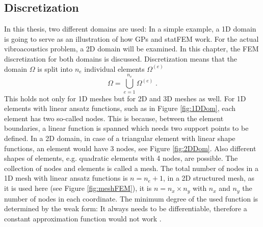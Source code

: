 \documentclass[%
  a4paper,oneside,%
  11pt,%
  smallchapters,
  style=printdev,
  extramargin,
  green,%
  rgb, <cmyk>
  ]{tubsbook}
\begin{document}
\subsection{Discretization}
In this thesis, two different domains are used: In a simple example, a 1D domain is going to serve as an illustration of how GPs and statFEM work. For the actual vibroacoustics problem, a 2D domain will be examined. In this chapter, the FEM discretization for both domains is discussed.
%
Discretization means that the domain $\Omega$ is split into $n_e$ individual elements $\Omega^{(e)}$
\begin{equation}
\Omega = \bigcup_{e=1}^{n_e} \Omega^{(e)} \;.
\end{equation}
This holds not only for 1D meshes but for 2D and 3D meshes as well.
For 1D elements with linear ansatz functions, such as in Figure \ref{fig:1DDom}, each element has two so-called nodes. This is because, between the element boundaries, a linear function is spanned which needs two support points to be defined.  In a 2D domain, in case of a triangular element with linear shape functions, an element would have 3 nodes, see Figure \ref{fig:2DDom}. Also different shapes of elements, e.g. quadratic elements with 4 nodes, are possible. The collection of nodes and elements is called a mesh. The total number of nodes in a 1D mesh with linear ansatz functions is $n = n_e + 1$, in a 2D structured mesh, as it is used here (see Figure \ref{fig:meshFEM}), it is $n = n_x \times n_y$ with $n_x$ and $n_y$ the number of nodes in each coordinate. The minimum degree of the used function is determined by the weak form: It always needs to be differentiable, therefore a constant approximation function would not work \cite{atalla2015}. 
\end{document}
